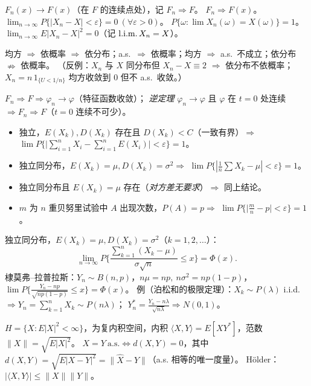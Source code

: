 \documentclass[UTF8,12pt,a4paper]{ctexart}
\begin{document}

 $F_n(x)\to F(x)$（在 $F$ 的连续点处），记 $F_n\Rightarrow F$。
 $F_n\Rightarrow F(x)$。
 $\lim_{n\to\infty}P\{|X_n-X|<\varepsilon\}=0\ (\forall\varepsilon>0)$。
 $P\{\omega:\lim X_n(\omega)=X(\omega)\}=1$。
 $\lim_{n\to\infty}E|X_n-X|^2=0$（记 $\mathop{\mathrm{l.i.m.}} X_n=X$）。

 均方 $\Rightarrow$ 依概率 $\Rightarrow$ 依分布；a.s.\ $\Rightarrow$ 依概率；均方 $\Rightarrow$ a.s.\ 不成立；依分布 $\nRightarrow$ 依概率。
（反例：$X_n$ 与 $X$ 同分布但 $X_n-X\equiv2$ $\Rightarrow$ 依分布不依概率；$X_n=n\,1_{\{U<1/n\}}$ 均方收敛到 0 但不 a.s.\ 收敛。）

 $F_n\Rightarrow F\Rightarrow\varphi_n\to\varphi$（特征函数收敛）；
\emph{逆定理} $\varphi_n\to\varphi$ 且 $\varphi$ 在 $t=0$ 处连续 $\Rightarrow F_n\Rightarrow F$（$t=0$ 连续不可少）。

\begin{itemize}
\item {} 独立，$E(X_k),D(X_k)$ 存在且 $D(X_k)<C$（一致有界）$\Rightarrow$ $\lim P\Big\{\Big|\sum_{i=1}^nX_i-\sum_{i=1}^nE(X_i)\Big|<\varepsilon\Big\}=1$。
\item {} 独立同分布，$E(X_k)=\mu,D(X_k)=\sigma^2\Rightarrow$ $\lim P\big\{|\frac1n\sum X_k-\mu|<\varepsilon\big\}=1$。
\item {} 独立同分布且 $E(X_k)=\mu$ 存在（\emph{对方差无要求}）$\Rightarrow$ 同上结论。
\item {} $m$ 为 $n$ 重贝努里试验中 $A$ 出现次数，$P(A)=p\Rightarrow$ $\lim P\big\{|\frac mn-p\big|<\varepsilon\big\}=1$。
\end{itemize}
 独立同分布，$E(X_k)=\mu,D(X_k)=\sigma^2$（$k=1,2,\dots$）：
$$\lim_{n\to\infty}P\Big\{\frac{\sum_{k=1}^n(X_k-\mu)}{\sigma\sqrt n}\le x\Big\}=\Phi(x).$$
棣莫弗--拉普拉斯：$Y_n\sim B(n,p)$，$n\mu=np,\ n\sigma^2=np(1-p)$，$\lim P\{\frac{Y_n-np}{\sqrt{np(1-p)}}\le x\}=\Phi(x)$。
例（泊松和的极限定理）：$X_k\sim P(\lambda)$ i.i.d. $\Rightarrow Y_n=\sum_{k=1}^nX_k\sim P(n\lambda)$；
$Y_n^*=\frac{Y_n-n\lambda}{\sqrt{n\lambda}}\Rightarrow N(0,1)$。

 $H=\{X: E|X|^2<\infty\}$，为复内积空间，内积 $\langle X,Y\rangle=E[XY^*]$，范数 $\|X\|=\sqrt{E|X|^2}$。
$\boxed{X=Y\ \text{a.s.}\iff d(X,Y)=0}$，其中 $d(X,Y)=\sqrt{E|X-Y|^2}=\|\hat X-Y\|$（a.s. 相等的唯一度量）。
Hölder：$|\langle X,Y\rangle|\le\|X\|\|Y\|$。
\end{document}
